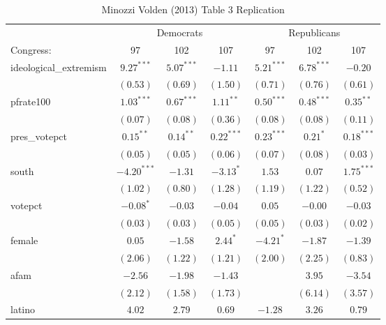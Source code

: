 \documentclass[12pt]{article}
\begin{document}
\begin{table}
	\begin{center}
		\caption{Minozzi Volden (2013) Table 3 Replication}
		\begin{tabular}{l c c c c c c }
			\hline
			& \multicolumn{3}{c}{Democrats} & \multicolumn{3}{c}{Republicans} \\
			\cline{2-7}
			Congress: &  97 & 102 & 107 & 97 & 102 & 107 \\
			\hline
			ideological\_extremism & $9.27^{***}$  & $5.07^{***}$  & $-1.11$      & $5.21^{***}$ & $6.78^{***}$  & $-0.20$       \\
			& $(0.53)$      & $(0.69)$      & $(1.50)$     & $(0.71)$     & $(0.76)$      & $(0.61)$      \\
			pfrate100              & $1.03^{***}$  & $0.67^{***}$  & $1.11^{**}$  & $0.50^{***}$ & $0.48^{***}$  & $0.35^{**}$   \\
			& $(0.07)$      & $(0.08)$      & $(0.36)$     & $(0.08)$     & $(0.08)$      & $(0.11)$      \\
			pres\_votepct          & $0.15^{**}$   & $0.14^{**}$   & $0.22^{***}$ & $0.23^{***}$ & $0.21^{*}$    & $0.18^{***}$  \\
			& $(0.05)$      & $(0.05)$      & $(0.06)$     & $(0.07)$     & $(0.08)$      & $(0.03)$      \\
			south                  & $-4.20^{***}$ & $-1.31$       & $-3.13^{*}$  & $1.53$       & $0.07$        & $1.75^{***}$  \\
			& $(1.02)$      & $(0.80)$      & $(1.28)$     & $(1.19)$     & $(1.22)$      & $(0.52)$      \\
			votepct                & $-0.08^{*}$   & $-0.03$       & $-0.04$      & $0.05$       & $-0.00$       & $-0.03$       \\
			& $(0.03)$      & $(0.03)$      & $(0.05)$     & $(0.05)$     & $(0.03)$      & $(0.02)$      \\
			female                 & $0.05$        & $-1.58$       & $2.44^{*}$   & $-4.21^{*}$  & $-1.87$       & $-1.39$       \\
			& $(2.06)$      & $(1.22)$      & $(1.21)$     & $(2.00)$     & $(2.25)$      & $(0.83)$      \\
			afam                   & $-2.56$       & $-1.98$       & $-1.43$      &              & $3.95$        & $-3.54$       \\
			& $(2.12)$      & $(1.58)$      & $(1.73)$     &              & $(6.14)$      & $(3.57)$      \\
			latino                 & $4.02$        & $2.79$        & $0.69$       & $-1.28$      & $3.26$        & $0.79$        \\

\end{tabular}
\end{center}
\end{table}
\end{document}

